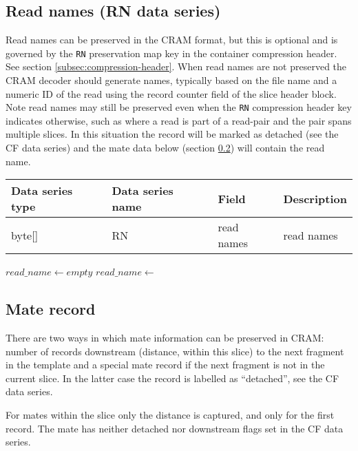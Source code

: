 \documentclass[a4paper]{article}
\begin{document}
\subsection{Read names (RN data series)}
\label{subsec:names}

Read names can be preserved in the CRAM format, but this is optional and is governed by the \texttt{RN} preservation map key in the container compression header. See section \ref{subsec:compression-header}.
When read names are not preserved the CRAM decoder should generate names, typically based on the file name and a numeric ID of the read using the record counter field of the slice header block.
Note read names may still be preserved even when the \texttt{RN} compression header key indicates otherwise, such as where a read is part of a read-pair and the pair spans multiple slices.
In this situation the record will be marked as detached (see the CF data series) and the mate data below (section \ref{subsec:mate}) will contain the read name.

\begin{tabular}{|>{\raggedright}p{70pt}|>{\raggedright}p{75pt}|>{\raggedright}p{90pt}|>{\raggedright}p{171pt}|}
\hline
\textbf{Data series type} & \textbf{Data series name} & \textbf{Field} & \textbf{Description}\tabularnewline
\hline
byte[] & RN & read names & read names\tabularnewline
\hline
\end{tabular}

\vskip 20pt
\begin{algorithmic}[1]
\State $read\_name \gets empty$
  \State $read\_name \gets$ 
\EndIf
\Statex
\EndProcedure
\end{algorithmic}

\subsection{Mate record}
\label{subsec:mate}

There are two ways in which mate information can be preserved in CRAM: number of records downstream (distance, within this slice) to the next fragment in the template and a special mate record if the next fragment is not in the current slice.
In the latter case the record is labelled as ``detached'', see the CF data series.

For mates within the slice only the distance is captured, and only for the first record.  The mate has neither detached nor downstream flags set in the CF data series.
\end{document}

